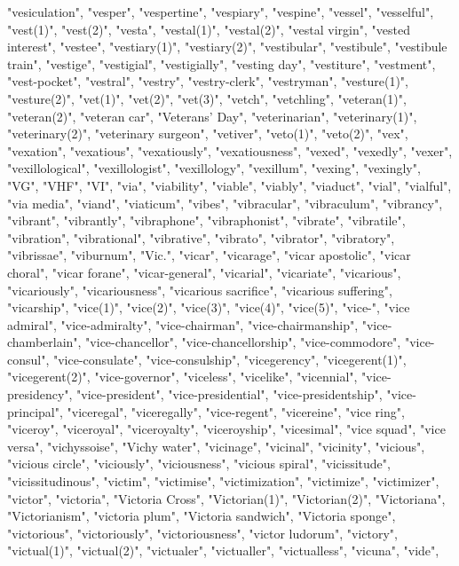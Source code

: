 "vesiculation",
"vesper",
"vespertine",
"vespiary",
"vespine",
"vessel",
"vesselful",
"vest(1)",
"vest(2)",
"vesta",
"vestal(1)",
"vestal(2)",
"vestal virgin",
"vested interest",
"vestee",
"vestiary(1)",
"vestiary(2)",
"vestibular",
"vestibule",
"vestibule train",
"vestige",
"vestigial",
"vestigially",
"vesting day",
"vestiture",
"vestment",
"vest-pocket",
"vestral",
"vestry",
"vestry-clerk",
"vestryman",
"vesture(1)",
"vesture(2)",
"vet(1)",
"vet(2)",
"vet(3)",
"vetch",
"vetchling",
"veteran(1)",
"veteran(2)",
"veteran car",
"Veterans' Day",
"veterinarian",
"veterinary(1)",
"veterinary(2)",
"veterinary surgeon",
"vetiver",
"veto(1)",
"veto(2)",
"vex",
"vexation",
"vexatious",
"vexatiously",
"vexatiousness",
"vexed",
"vexedly",
"vexer",
"vexillological",
"vexillologist",
"vexillology",
"vexillum",
"vexing",
"vexingly",
"VG",
"VHF",
"VI",
"via",
"viability",
"viable",
"viably",
"viaduct",
"vial",
"vialful",
"via media",
"viand",
"viaticum",
"vibes",
"vibracular",
"vibraculum",
"vibrancy",
"vibrant",
"vibrantly",
"vibraphone",
"vibraphonist",
"vibrate",
"vibratile",
"vibration",
"vibrational",
"vibrative",
"vibrato",
"vibrator",
"vibratory",
"vibrissae",
"viburnum",
"Vic.",
"vicar",
"vicarage",
"vicar apostolic",
"vicar choral",
"vicar forane",
"vicar-general",
"vicarial",
"vicariate",
"vicarious",
"vicariously",
"vicariousness",
"vicarious sacrifice",
"vicarious suffering",
"vicarship",
"vice(1)",
"vice(2)",
"vice(3)",
"vice(4)",
"vice(5)",
"vice-",
"vice admiral",
"vice-admiralty",
"vice-chairman",
"vice-chairmanship",
"vice-chamberlain",
"vice-chancellor",
"vice-chancellorship",
"vice-commodore",
"vice-consul",
"vice-consulate",
"vice-consulship",
"vicegerency",
"vicegerent(1)",
"vicegerent(2)",
"vice-governor",
"viceless",
"vicelike",
"vicennial",
"vice-presidency",
"vice-president",
"vice-presidential",
"vice-presidentship",
"vice-principal",
"viceregal",
"viceregally",
"vice-regent",
"vicereine",
"vice ring",
"viceroy",
"viceroyal",
"viceroyalty",
"viceroyship",
"vicesimal",
"vice squad",
"vice versa",
"vichyssoise",
"Vichy water",
"vicinage",
"vicinal",
"vicinity",
"vicious",
"vicious circle",
"viciously",
"viciousness",
"vicious spiral",
"vicissitude",
"vicissitudinous",
"victim",
"victimise",
"victimization",
"victimize",
"victimizer",
"victor",
"victoria",
"Victoria Cross",
"Victorian(1)",
"Victorian(2)",
"Victoriana",
"Victorianism",
"victoria plum",
"Victoria sandwich",
"Victoria sponge",
"victorious",
"victoriously",
"victoriousness",
"victor ludorum",
"victory",
"victual(1)",
"victual(2)",
"victualer",
"victualler",
"victualless",
"vicuna",
"vide",
